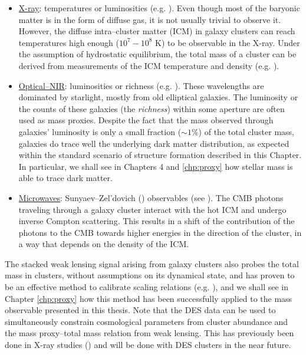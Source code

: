 \begin{itemize}
\item \underline{X-ray}: temperatures or luminosities (e.g. \citealt{shimizu,2007A&A...467..437Z}). Even though most of the baryonic matter is in the form of diffuse gas, it is not usually trivial to observe it. However, the diffuse intra--cluster matter (ICM) in galaxy clusters can reach temperatures high enough ($10^7-10^8$ K) to be observable in the X-ray. Under the assumption of hydrostatic equilibrium, the total mass of a cluster can be derived from measurements of the ICM temperature and density (e.g. \citealt{sarazin}).
\item \underline{Optical--NIR}: luminosities or richness (e.g. \citealt{lambda,andreon12}). These wavelengths are dominated by starlight, mostly from old elliptical galaxies. The luminosity or the counts of these galaxies (the \emph{richness}) within some aperture are often used as mass proxies. Despite the fact that the mass observed through galaxies' luminosity is only a small fraction ($\sim 1\%$) of the total cluster mass, galaxies do trace well the underlying dark matter distribution, as expected within the standard scenario of structure formation described in this Chapter. In particular, we shall see in Chapters 4 and \ref{chp:proxy} how stellar mass is able to trace dark matter.
\item \underline{Microwaves}: Sunyaev--Zel'dovich (\citealt{sz}) observables (see \citealt{2002ARA&A..40..643C}). The CMB photons traveling through a galaxy cluster interact with the hot ICM and undergo inverse Compton scattering. This results in a shift of the contribution of the photons to the CMB towards higher energies in the direction of the cluster, in a way that depends on the density of the ICM.
\end{itemize}

The stacked weak lensing signal arising from galaxy clusters also probes the total mass in clusters, without assumptions on its dynamical state, and has proven to be an effective method to calibrate scaling relations (e.g. \citealt{Johnston07,rozo09}), and we shall see in Chapter \ref{chp:proxy} how this method has been successfully applied to the mass observable presented in this thesis. Note that the DES data can be used to simultaneously constrain cosmological parameters from cluster abundance and the mass proxy--total mass relation from weak lensing. This has previously been done in X-ray studies (\citealt{2010MNRAS.406.1759M}) and will be done with DES clusters in the near future.

